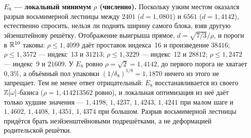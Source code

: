 \textbf{$E_8$ --- локальный минимум $\rho$ (численно).} Поскольку узким местом
оказался разрыв восьмимерной лестницы между $2401$ ($d=1{,}0801$) и $6561$
($d=1{,}4142$), естественно спросить, нельзя ли поднять ширину самого блока,
взяв другую эйзенштейнову решётку. Отображение выигрыша прямое,
$d=\sqrt{7/3}/\rho$, и пороги в $\mathbb{R}^{10}$ таковы: $\rho\le1{,}4099$ даёт
проставок индекса~16 и произведение $38416$; $\rho\le1{,}3572$ --- индекс~13 и
$31213$; $\rho\le1{,}3229$ --- индекс~12 и $28812$; $\rho\le1{,}2472$ ---
индекс~9 и $21609$. У $E_8$ ровно $\rho=\sqrt2=1{,}4142$, до первого порога не
хватает $0{,}3\%$, а объёмный пол упаковки $(1/\delta_8)^{1/8}=1{,}1870$ ничего
из этого не запрещает. Тем не менее ответ отрицательный: $E_8$ восстанавливается
из своего $\mathbb{Z}[\omega]$-базиса ($\rho=1{,}414213562$ ровно), и локальная
оптимизация из неё даёт только худшие значения --- $1{,}4198$, $1{,}4237$,
$1{,}4243$, $1{,}4241$ при малом шаге и $1{,}4602$, $1{,}4408$, $1{,}4351$,
$1{,}4374$ при большом. Разрыв восьмимерной лестницы придётся брать
неэйзенштейновыми подрешётками, а не деформацией родительской решётки.
